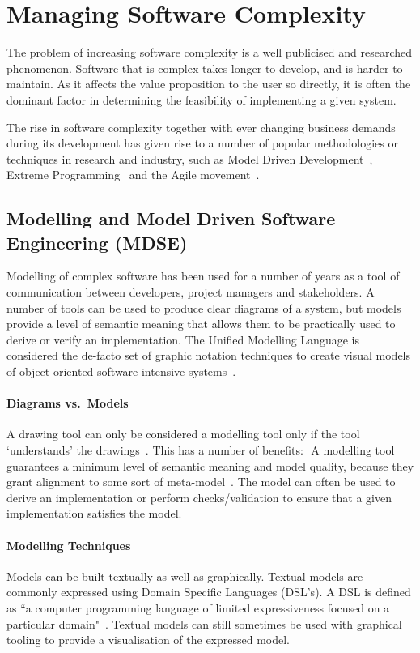 \documentclass{cshonours}
\begin{document}
\section{Managing Software Complexity}

The problem of increasing software complexity is a well publicised and researched phenomenon. Software that is complex takes longer to develop, and is harder to maintain. As it affects the value proposition to the user so directly, it is often the dominant factor in determining the feasibility of implementing a given system.

The rise in software complexity together with ever changing business demands during its development has given rise to a number of popular methodologies or techniques in research and industry, such as Model Driven Development~\cite{MDD}, Extreme Programming~\cite{BeckXP} and the Agile movement~\cite{AgileManifesto}.

\subsection{Modelling and Model Driven Software Engineering (MDSE)}

Modelling of complex software has been used for a number of years as a tool of communication between developers, project managers and stakeholders. A number of tools can be used to produce clear diagrams of a system, but models provide a level of semantic meaning that allows them to be practically used to derive or verify an implementation. The Unified Modelling Language is considered the de-facto set of graphic notation techniques to create visual models of object-oriented software-intensive systems~\cite{UMLDefinition}.

\paragraph{Diagrams vs.\ Models}
A drawing tool can only be considered a modelling tool only if the tool `understands' the drawings~\cite[p.~11]{ModelDrivenDevelopment}. This has a number of benefits: 
A modelling tool guarantees a minimum level of semantic meaning and model quality, because they grant alignment to some sort of meta-model~\cite[p.~12]{ModelDrivenDevelopment}.
The model can often be used to derive an implementation or perform checks/validation to ensure that a given implementation satisfies the model. 

\paragraph{Modelling Techniques}
Models can be built textually as well as graphically. Textual models are commonly expressed using Domain Specific Languages (DSL’s). A DSL is defined as ``a computer programming language of limited expressiveness focused on a particular domain"~\cite{FowlerDSL}. Textual models can still sometimes be used with graphical tooling to provide a visualisation of the expressed model.
\end{document}
